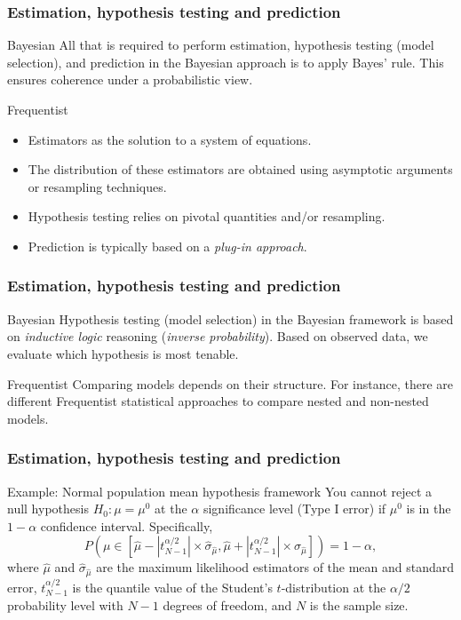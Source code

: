 \documentclass[12pt, compress]{beamer}
\begin{document}
\begin{frame}
	\frametitle{Estimation, hypothesis testing and prediction}
	\begin{block}{Bayesian}
		All that is required to perform estimation, hypothesis testing (model selection), and prediction in the Bayesian approach is to apply Bayes' rule. This ensures coherence under a probabilistic view.
	\end{block}

	\begin{block}{Frequentist}
		\begin{itemize}
			\item Estimators as the solution to a system of equations.
			\item The distribution of these estimators are obtained using asymptotic arguments or resampling techniques.
			\item Hypothesis testing relies on pivotal quantities and/or resampling.
			\item Prediction is typically based on a \textit{plug-in approach}.   
		\end{itemize}
\end{block}

\end{frame}

\begin{frame}
	\frametitle{Estimation, hypothesis testing and prediction}
	\begin{block}{Bayesian}
		Hypothesis testing (model selection) in the Bayesian framework is based on \textit{inductive logic} reasoning (\textit{inverse probability}). Based on observed data, we evaluate which hypothesis is most tenable.
	\end{block}

	\begin{block}{Frequentist}
	Comparing models depends on their structure. For instance, there are different Frequentist statistical approaches to compare nested and non-nested models.
\end{block}

\end{frame}

\begin{frame}
	\frametitle{Estimation, hypothesis testing and prediction}
	\begin{block}{Example: Normal population mean hypothesis framework}
		You cannot reject a null hypothesis $H_0: \mu = \mu^0$ at the $\alpha$ significance level (Type I error) if $\mu^0$ is in the $1-\alpha$ confidence interval. Specifically, 
		\[
		P\left( \mu \in \left[\hat{\mu} - |t_{N-1}^{\alpha/2}| \times \hat{\sigma}_{\hat{\mu}}, \hat{\mu} + |t_{N-1}^{\alpha/2}| \times \hat{\sigma}_{\hat{\mu}}\right] \right) = 1 - \alpha,
		\]
		where $\hat{\mu}$ and $\hat{\sigma}_{\hat{\mu}}$ are the maximum likelihood estimators of the mean and standard error, $t_{N-1}^{\alpha/2}$ is the quantile value of the Student's $t$-distribution at the $\alpha/2$ probability level with $N-1$ degrees of freedom, and $N$ is the sample size.
	\end{block}
\end{frame}
\end{document}
